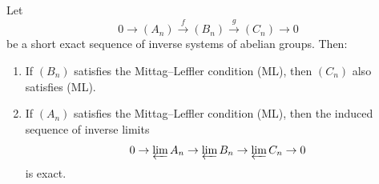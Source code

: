 Let
$$0 \to (A_n) \xrightarrow{f} (B_n) \xrightarrow{g} (C_n) \to 0$$
be a short exact sequence of inverse systems of abelian groups. Then:
\begin{enumerate}
\item[(a)] If $(B_n)$ satisfies the Mittag--Leffler condition (ML), then $(C_n)$ also satisfies (ML).
\item[(b)] If $(A_n)$ satisfies the Mittag--Leffler condition (ML), then the induced sequence of inverse limits
$$0 \to \varprojlim A_n \to \varprojlim B_n \to \varprojlim C_n \to 0$$
is exact.
\end{enumerate}
